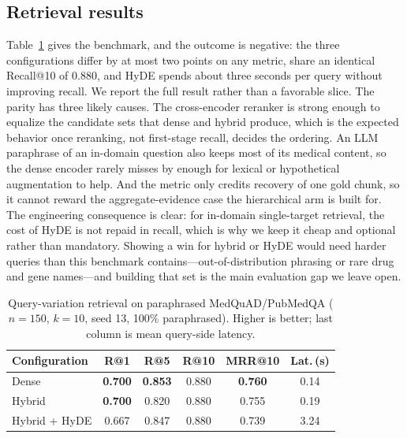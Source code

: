 \documentclass[conference]{IEEEtran}
\begin{document}
\subsection{Retrieval results}
Table~\ref{tab:retrieval} gives the benchmark, and the outcome is negative: the
three configurations differ by at most two points on any metric, share an
identical Recall@10 of $0.880$, and HyDE spends about three seconds per query
without improving recall. We report the full result rather than a favorable
slice. The parity has three likely causes. The cross-encoder reranker is strong
enough to equalize the candidate sets that dense and hybrid produce, which is the
expected behavior once reranking, not first-stage recall, decides the ordering.
An LLM paraphrase of an in-domain question also keeps most of its medical
content, so the dense encoder rarely misses by enough for lexical or hypothetical
augmentation to help. And the metric only credits recovery of one gold chunk, so
it cannot reward the aggregate-evidence case the hierarchical arm is built for.
The engineering consequence is clear: for in-domain single-target retrieval, the
cost of HyDE is not repaid in recall, which is why we keep it cheap and optional
rather than mandatory. Showing a win for hybrid or HyDE would need harder queries
than this benchmark contains---out-of-distribution phrasing or rare drug and gene
names---and building that set is the main evaluation gap we leave open.
\begin{table}[t]
\caption{Query-variation retrieval on paraphrased MedQuAD/PubMedQA
($n{=}150$, $k{=}10$, seed 13, 100\% paraphrased). Higher is better; last column
is mean query-side latency.}
\label{tab:retrieval}
\centering
\begin{tabular}{lccccc}
\toprule
Configuration & R@1 & R@5 & R@10 & MRR@10 & Lat.\,(s) \\
\midrule
Dense          & \textbf{0.700} & \textbf{0.853} & 0.880 & \textbf{0.760} & 0.14 \\
Hybrid         & \textbf{0.700} & 0.820 & 0.880 & 0.755 & 0.19 \\
Hybrid + HyDE  & 0.667 & 0.847 & 0.880 & 0.739 & 3.24 \\
\bottomrule
\end{tabular}
\end{table}
\end{document}
